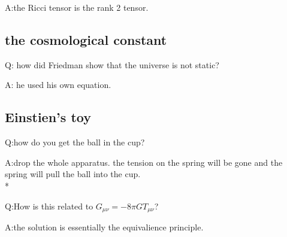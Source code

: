 \documentclass{article}
\begin{document}
A:the Ricci tensor is the rank 2 tensor. 
\subsection{the cosmological constant}
\hspace{0.5cm}Q: how did Friedman show that the universe is not static?

A: he used his own equation. 
\subsection{Einstien's toy}
\hspace{0.5cm}Q:how do you get the ball in the cup?

A:drop the whole apparatus. the tension on the spring will be gone and the spring will pull the ball into the cup. 
\\*

Q:How is this related to $G_{\mu\nu}=-8\pi GT_{\mu\nu}$?

A:the solution is essentially the equivalience principle.
\end{document}
